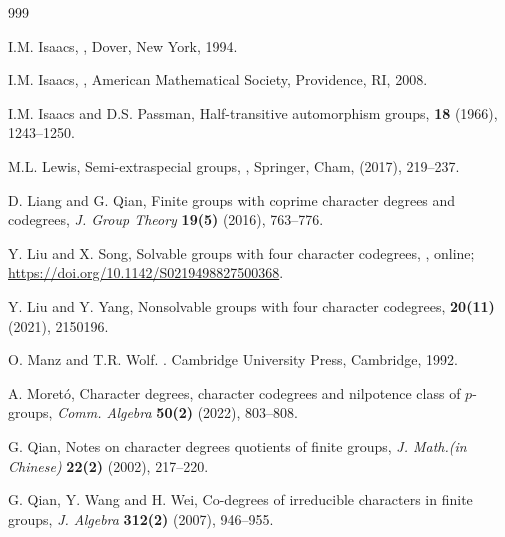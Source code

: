 \documentclass[9pt]{article}
\begin{document}
\begin{thebibliography}{999}
	 

   I.M. Isaacs,
   ,
   \newblock Dover, New York, 1994.


   I.M. Isaacs,
   ,
   \newblock  American Mathematical Society, Providence, RI, 2008.





	I.M. Isaacs and D.S. Passman,
	\newblock Half-transitive automorphism groups,
	 {\bf18} (1966), 1243--1250.






	M.L. Lewis,
	\newblock Semi-extraspecial groups,
	, Springer, Cham, (2017), 219--237.

	D. Liang and G. Qian,
	\newblock Finite groups with coprime character degrees and codegrees,
	\newblock \emph{J. Group Theory} {\bf 19(5)} (2016), 763--776.


	Y. Liu and X. Song,
	\newblock Solvable groups with four character codegrees,
	, online; 
    \href{https://doi.org/10.1142/S0219498827500368}{https://doi.org/10.1142/S0219498827500368}.

	Y. Liu and Y. Yang,
	\newblock  Nonsolvable groups with four character codegrees,
	 {\bf20(11)} (2021), 2150196.






	O. Manz and T.R. Wolf.
	.
	\newblock Cambridge University
   Press, Cambridge, 1992.





   A. Moret\'o,
   \newblock Character degrees, character codegrees and nilpotence class of $p$-groups,
   \newblock \emph{Comm. Algebra} {\bf 50(2)} (2022), 803--808.





	G. Qian,
	\newblock Notes on character degrees quotients of finite groups,
	\newblock \emph{J. Math.(in Chinese)} {\bf 22(2)} (2002), 217--220.

	
 

	G. Qian, Y. Wang and H. Wei,
	\newblock Co-degrees of irreducible characters in finite groups,
	\newblock \emph{J. Algebra} {\bf 312(2)} (2007), 946--955.


\end{thebibliography}
\end{document}
